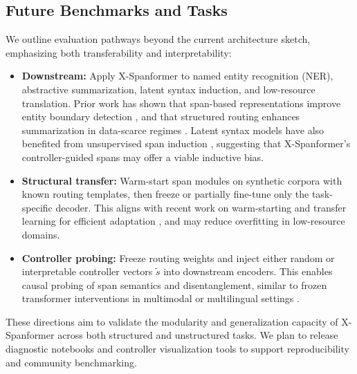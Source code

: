 \subsection{Future Benchmarks and Tasks}
\label{sec:future-tasks}

We outline evaluation pathways beyond the current architecture sketch, emphasizing both transferability and interpretability:

\begin{itemize}[leftmargin=1.5em]
  \item \textbf{Downstream:} Apply X-Spanformer to named entity recognition (NER), abstractive summarization, latent syntax induction, and low-resource translation. Prior work has shown that span-based representations improve entity boundary detection \cite{li2020unified}, and that structured routing enhances summarization in data-scarce regimes \cite{bajaj2021long, ziegler2024craft}. Latent syntax models have also benefited from unsupervised span induction \cite{kim2019unsupervised}, suggesting that X-Spanformer's controller-guided spans may offer a viable inductive bias.
  
  \item \textbf{Structural transfer:} Warm-start span modules on synthetic corpora with known routing templates, then freeze or partially fine-tune only the task-specific decoder. This aligns with recent work on warm-starting and transfer learning for efficient adaptation \cite{dhole2025frozen, ziegler2024craft}, and may reduce overfitting in low-resource domains.

  \item \textbf{Controller probing:} Freeze routing weights and inject either random or interpretable controller vectors \(\tilde{s}\) into downstream encoders. This enables causal probing of span semantics and disentanglement, similar to frozen transformer interventions in multimodal or multilingual settings \cite{zhang2023frozen, dhole2025frozen}.
\end{itemize}

These directions aim to validate the modularity and generalization capacity of X-Spanformer across both structured and unstructured tasks. We plan to release diagnostic notebooks and controller visualization tools to support reproducibility and community benchmarking.
